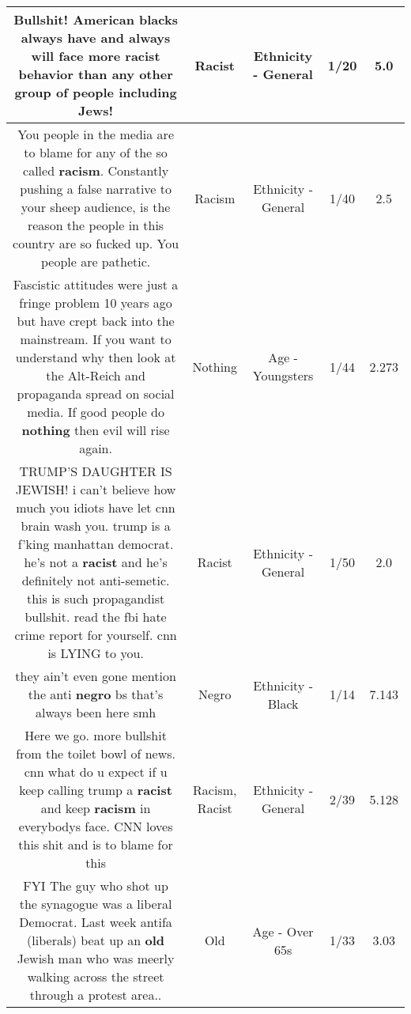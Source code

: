 \documentclass[11pt]{article}
\newlength\mylength
\begin{document}
\begin{center}
\begin{longtable}{|C{.65\mylength}|C{.30\mylength}|C{.12\mylength}|C{.12\mylength}|C{.12\mylength}|}
  \small Bullshit! American blacks always have and always will face more \textbf{racist} behavior than any other group of people including Jews!\normalsize   & Racist & Ethnicity - General & 1/20 & 5.0 \\  \hline
  \small You people in the media are to blame for any of the so called \textbf{racism}. Constantly pushing a false narrative to your sheep audience, is the reason the people in this country are so fucked up. You people are pathetic.\normalsize   & Racism & Ethnicity - General & 1/40 & 2.5 \\  \hline
  \small Fascistic attitudes were just a fringe problem 10 years ago but have crept back into the mainstream. If you want to understand why then look at the Alt-Reich and propaganda spread on social media. If good people do \textbf{nothing} then evil will rise again.\normalsize   & Nothing & Age - Youngsters & 1/44 & 2.273 \\  \hline
  \small TRUMP'S DAUGHTER IS JEWISH!  i can't believe how much you idiots have let cnn brain wash you.  trump is a f'king manhattan democrat.  he's not a \textbf{racist} and he's definitely not anti-semetic.  this is such propagandist bullshit.  read the fbi hate crime report for yourself.   cnn is LYING to you.\normalsize   & Racist & Ethnicity - General & 1/50 & 2.0 \\  \hline
  \small they ain't even gone mention the anti \textbf{negro} bs that's always been here smh\normalsize   & Negro & Ethnicity - Black & 1/14 & 7.143 \\  \hline
  \small Here we go. more bullshit from the toilet bowl of news. cnn what do u expect if u keep calling trump a \textbf{racist} and keep \textbf{racism} in everybodys face. CNN loves this shit and is to blame for this\normalsize   & Racism, Racist & Ethnicity - General & 2/39 & 5.128 \\  \hline
  \small FYI    The guy who shot up the synagogue was a liberal Democrat. Last week antifa (liberals) beat up an \textbf{old} Jewish man who was meerly walking across the street through a protest area..\normalsize   & Old & Age - Over 65s & 1/33 & 3.03 \\  \hline

\end{longtable}
\end{center}
\end{document}
